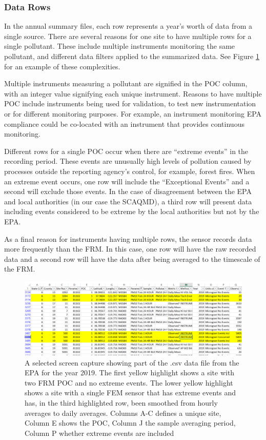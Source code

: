 \subsubsection*{Data Rows} \label{subsubsec:DataRows}
In the annual summary files, each row represents a year's worth of data from a single source. There are several reasons for one site to have multiple rows for a single pollutant.  These include multiple instruments monitoring the same pollutant, and different data filters applied to the summarized data.  See Figure  \ref{fig:Example_Raw_EPA_Data} for an example of these complexities.

Multiple instruments measuring a pollutant are signified in the \ac{POC} column, with an integer value signifying each unique instrument.  Reasons to have multiple \ac{POC} include instruments being used for validation, to test new instrumentation or for different monitoring purposes.  For example, an instrument monitoring \ac{EPA} compliance could be co-located with an instrument that provides continuous monitoring.

Different rows for a single \ac{POC} occur when there are ``extreme events'' in the recording period.  These events are unusually high levels of pollution caused by processes outside the reporting agency's control, for example, forest fires.  When an extreme event occurs, one row will include the ``Exceptional Events'' and a second will exclude those events.  In the case of disagreement between the \ac{EPA} and local authorities (in our case the \ac{SCAQMD}), a third row will present data including events considered to be extreme by the local authorities but not by the \ac{EPA}.

As a final reason for instruments having multiple rows, the sensor records data more frequently than the \ac{FRM}.  In this case, one row will have the raw recorded data and a second row will have the data after being averaged to the timescale of the \ac{FRM}.  

\begin{figure}[ht]
\centering
\includegraphics[width = \textwidth]{Figures/Validation/Example_Raw_EPA_Data.png}
\caption{A selected screen capture showing part of the .csv data file from the EPA for the year 2019.  The first yellow highlight shows a site with two \ac{FRM} \ac{POC} and no extreme events.  The lower yellow highlight shows a site with a single \ac{FEM} sensor that has extreme events and has, in the third highlighted row, been smoothed from hourly averages to daily averages.  Columns A-C defines a unique site, Column E shows the \ac{POC}, Column J the sample averaging period, Column P whether extreme events are included}
\label{fig:Example_Raw_EPA_Data}
\end{figure}

